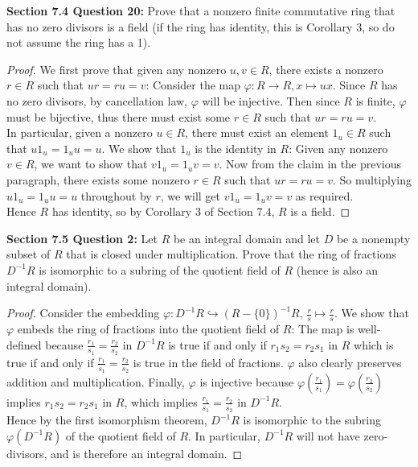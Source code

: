 \documentclass{article}
\begin{document}
\textbf{Section 7.4 Question 20:} Prove that a nonzero finite commutative
  ring that has no zero divisors is a field (if the ring has identity, this
  is Corollary 3, so do not assume the ring has a 1).
  \begin{proof}
    We first prove that given any nonzero $u,v\in R$, there exists a
    nonzero $r\in R$ such that $ur=ru=v$: Consider the map
    $\varphi:R\rightarrow R, x\mapsto ux$. Since $R$ has no zero divisors,
    by cancellation law, $\varphi$ will be injective. Then since $R$ is
    finite, $\varphi$ must be bijective, thus there must exist some $r\in
    R$ such that $ur=ru=v$. \\

    In particular, given a nonzero $u\in R$, there must exist an element
    $1_u\in R$ such that $u1_u=1_uu=u$. We show that $1_u$ is the identity
    in $R$: Given any nonzero $v\in R$, we want to show that $v1_u=1_uv=v$.
    Now from the claim in the previous paragraph, there exists some nonzero
    $r\in R$ such that $ur=ru=v$. So multiplying $u1_u=1_uu=u$ throughout
    by $r$, we will get $v1_u=1_uv=v$ as required. \\

    Hence $R$ has identity, so by Corollary 3 of Section 7.4, $R$ is a
    field.
  \end{proof}

\textbf{Section 7.5 Question 2:} Let $R$ be an integral domain and let $D$
  be a nonempty subset of $R$ that is closed under multiplication. Prove
  that the ring of fractions $D^{-1}R$ is isomorphic to a subring of the
  quotient field of $R$ (hence is also an integral domain).

  \begin{proof}
    Consider the embedding $\varphi:D^{-1}R\hookrightarrow(R-\{0\})^{-1}R$,
    $\frac{r}{s}\mapsto\frac{r}{s}$. We show that $\varphi$ embeds the ring
    of fractions into the quotient field of $R$: The map is well-defined
    because $\frac{r_1}{s_1}=\frac{r_2}{s_2}$ in $D^{-1}R$ is true if and
    only if $r_1s_2=r_2s_1$ in $R$ which is true if and only if
    $\frac{r_1}{s_1}=\frac{r_2}{s_2}$ is true in the field of fractions.
    $\varphi$ also clearly preserves addition and multiplication. Finally,
    $\varphi$ is injective because
    $\varphi(\frac{r_1}{s_1})=\varphi(\frac{r_2}{s_2})$ implies
    $r_1s_2=r_2s_1$ in $R$, which implies $\frac{r_1}{s_1}=\frac{r_2}{s_2}$
    in $D^{-1}R$. \\

    Hence by the first isomorphism theorem, $D^{-1}R$ is isomorphic to the
    subring $\varphi(D^{-1}R)$ of the quotient field of $R$. In particular,
    $D^{-1}R$ will not have zero-divisors, and is therefore an integral
    domain.
  \end{proof}
\end{document}
